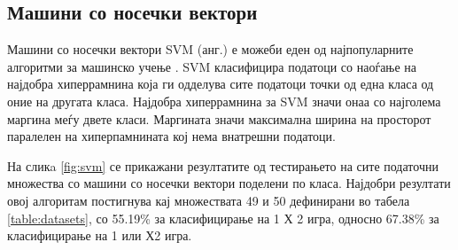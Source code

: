 \subsection{Машини со носечки вектори}
Машини со носечки вектори SVM (анг.) \cite{cortes1995support} е можеби еден од најпопуларните алгоритми за машинско учење \cite{lameski2015svm, zdravevski2015robust}.
SVM класифицира податоци со наоѓање на најдобра хиперрамнина која ги одделува сите податоци точки од една класа од оние на другата класа. Најдобра хиперрамнина за SVM значи онаа со најголема маргина меѓу двете класи. Маргината значи максимална ширина на просторот паралелен на хиперпамнината кој нема внатрешни податоци.

На сликa \ref{fig:svm} се прикажани резултатите од тестирањето на сите податочни множества со машини со носечки вектори поделени по класа. Најдобри резултати овој алгоритам постигнува кај множествата 49 и 50 дефинирани во табела \ref{table:datasets}, со 55.19\% за класифицирање на 1 Х 2 игра, односно 67.38\% за класифицирање на 1 или Х2 игра.

